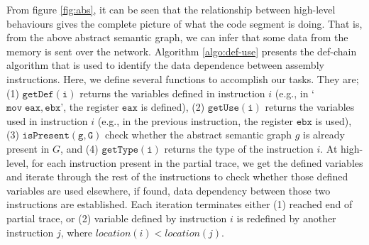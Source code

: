 From figure \ref{fig:abs}, it can be seen that the relationship between high-level behaviours gives the complete picture of what the code segment is doing. That is, from the above abstract semantic graph, we can infer that some data from the memory is sent over the network.  Algorithm \ref{algo:def-use} presents the def-chain algorithm that is used to identify the data dependence between assembly instructions. Here, we define several functions to accomplish our tasks. They are; (1) $\mathtt{getDef(i)}$ returns the variables defined in instruction $i$ (e.g., in `$\mathtt{mov\;eax,ebx}$', the register $\mathtt{eax}$ is defined), (2) $\mathtt{getUse(i)}$ returns the variables used in instruction $i$ (e.g., in the previous instruction, the register $\mathtt{ebx}$ is used), (3) $\mathtt{isPresent(g,G)}$ check whether the abstract semantic graph $g$ is already present in $G$, and (4) $\mathtt{getType(i)}$  returns the type of the instruction $i$. At high-level, for each instruction present in the partial trace, we get the defined variables and iterate through the rest of the instructions to check whether those defined variables are used elsewhere, if found, data dependency between those two instructions are established. Each iteration terminates either (1) reached end of partial trace, or (2) variable defined by instruction $i$ is redefined by another instruction $j$, where $location(i) < location(j)$.

